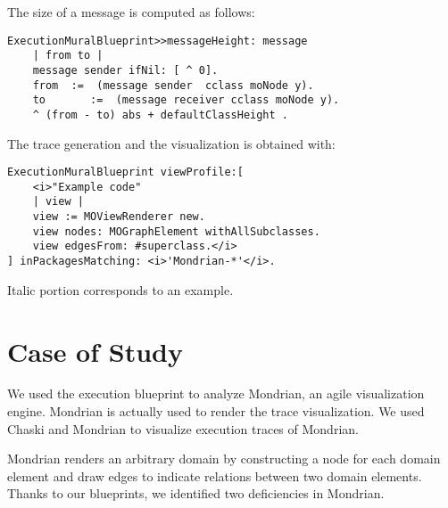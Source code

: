 \documentclass{sig-alternate}
\newcommand{\seclabel}[1]{\label{sec:#1}}
\begin{document}
The size of a message is computed as follows:
\begin{lstlisting}[]
ExecutionMuralBlueprint>>messageHeight: message
	| from to |
	message sender ifNil: [ ^ 0]. 
	from  :=  (message sender  cclass moNode y).
	to       :=  (message receiver cclass moNode y).
	^ (from - to) abs + defaultClassHeight .
\end{lstlisting}

The trace generation and the visualization is obtained with:

\begin{lstlisting}[]
ExecutionMuralBlueprint viewProfile:[
	<i>"Example code"
	| view |
	view := MOViewRenderer new.
	view nodes: MOGraphElement withAllSubclasses.
	view edgesFrom: #superclass.</i>
] inPackagesMatching: <i>'Mondrian-*'</i>.
\end{lstlisting}

Italic portion corresponds to an example.



\section{Case of Study}\seclabel{caseStudy}

We used the execution blueprint to analyze Mondrian, an agile visualization engine. Mondrian is actually used to render the trace visualization. We used Chaski and Mondrian to visualize execution traces of Mondrian.

Mondrian renders an arbitrary domain by constructing a node for each domain element and draw edges to indicate relations between two domain elements. Thanks to our blueprints, we identified two deficiencies in Mondrian. 
\end{document}
